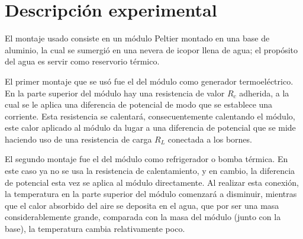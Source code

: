\section{Descripción experimental}

El montaje usado consiste en un módulo Peltier montado en una base de aluminio, la cual se sumergió en una nevera de icopor llena de agua; el propósito del agua es servir como reservorio térmico. 

El primer montaje que se usó fue el del módulo como generador termoeléctrico. En la parte superior del módulo hay una resistencia de valor $R_c$ adherida, a la cual se le aplica una diferencia de potencial de modo que se establece una corriente. Esta resistencia se calentará, consecuentemente calentando el módulo, este calor aplicado al módulo da lugar a una diferencia de potencial que se mide haciendo uso de una resistencia de carga $R_L$ conectada a los bornes. 

El segundo montaje fue el del módulo como refrigerador o bomba térmica. En este caso ya no se usa la resistencia de calentamiento, y en cambio, la diferencia de potencial esta vez se aplica al módulo directamente. Al realizar esta conexión, la temperatura en la parte superior del módulo comenzará a disminuir, mientras que el calor absorbido del aire se deposita en el agua, que por ser una masa considerablemente grande, comparada con la masa del módulo (junto con la base), la temperatura cambia relativamente poco.